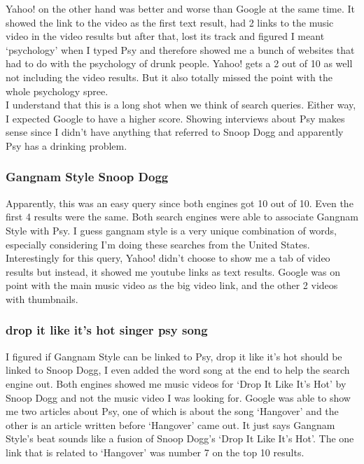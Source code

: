 \documentclass[10pt,letterpaper,bibliography=totocnumbered]{scrartcl}
\begin{document}
Yahoo! on the other hand was better and worse than Google at the same time. It showed the link to the video as the first text result, had 2 links to the music video in the video results but after that, lost its track and figured I meant `psychology' when I typed Psy and therefore showed me a bunch of websites that had to do with the psychology of drunk people. Yahoo! gets a 2 out of 10 as well not including the video results. But it also totally missed the point with the whole psychology spree. \\

I understand that this is a long shot when we think of search queries. Either way, I expected Google to have a higher score. Showing interviews about Psy makes sense since I didn't have anything that referred to Snoop Dogg and apparently Psy has a drinking problem. 

\subsubsection{Gangnam Style Snoop Dogg}
Apparently, this was an easy query since both engines got 10 out of 10. Even the first 4 results were the same. Both search engines were able to associate Gangnam Style with Psy. I guess gangnam style is a very unique combination of words, especially considering I'm doing these searches from the United States. \\

Interestingly for this query, Yahoo! didn't choose to show me a tab of video results but instead, it showed me youtube links as text results. Google was on point with the main music video as the big video link, and the other 2 videos with thumbnails. 

\subsubsection{drop it like it's hot singer psy song}
I figured if Gangnam Style can be linked to Psy, drop it like it's hot should be linked to Snoop Dogg, I even added the word song at the end to help the search engine out. Both engines showed me music videos for `Drop It Like It's Hot' by Snoop Dogg and not the music video I was looking for. Google was able to show me two articles about Psy, one of which is about the song `Hangover' and the other is an article written before `Hangover' came out. It just says Gangnam Style's beat sounds like a fusion of Snoop Dogg's `Drop It Like It's Hot'. The one link that is related to `Hangover' was number 7 on the top 10 results.\\
\end{document}
